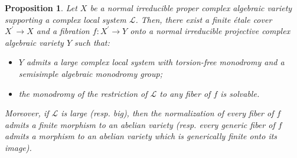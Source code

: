 \documentclass[10pt,a4paper]{amsart}
\newtheorem{prop}{Proposition}
\def\cL{\mathcal{L}}
\begin{document}
\begin{prop}\label{fibration solvable/semisimple}
Let $X$ be a normal irreducible proper complex algebraic variety supporting a complex local system $\cL$. Then, there exist a finite étale cover $X^\prime \to X$ and a fibration $f \colon X^\prime \to Y$ onto a normal irreducible projective complex algebraic variety $Y$ such that:
\begin{itemize}
\item $Y$ admits a large complex local system with torsion-free monodromy and a semisimple algebraic monodromy group;
\item the monodromy of the restriction of $\cL$ to any fiber of $f$ is solvable.
\end{itemize} 
Moreover, if $\cL$ is large (resp. big), then the normalization of every fiber of $f$ admits a finite morphism to an abelian variety (resp. every generic fiber of $f$ admits a morphism to an abelian variety which is generically finite onto its image).
\end{prop}
\end{document}

